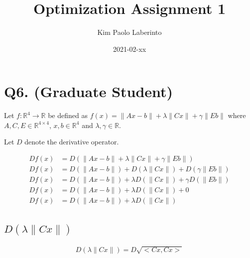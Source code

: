 \documentclass{article}
\title{Optimization Assignment 1}
\date{2021-02-xx}
\author{Kim Paolo Laberinto}
\begin{document}
    \maketitle
    \newpage

    \section{Q6. (Graduate Student)}

    Let $f: \mathbb{R}^4 \rightarrow \mathbb{R}$ be defined as $f(x) = \| Ax - b \| + \lambda \| Cx \| + \gamma \| Eb \|$ where $A, C, E \in \mathbb{R}^{4 \times 4}$, $x,b \in \mathbb{R}^4$ and $\lambda,\gamma \in \mathbb{R}$.

    Let $D$ denote the derivative operator.

    \begin{align*}
    Df(x) &= D \left( \| Ax - b \| + \lambda \| Cx \| + \gamma \| Eb \| \right) \\
    Df(x) &= D \left( \| Ax - b \| \right) +  D \left(\lambda \| Cx \| \right) +  D \left(\gamma \| Eb \| \right) \\
    Df(x) &= D \left( \| Ax - b \| \right) +  \lambda D \left( \| Cx \| \right) +  \gamma D \left( \| Eb \| \right) \\
    Df(x) &= D \left( \| Ax - b \| \right) +  \lambda D \left( \| Cx \| \right) +  0 \\
    Df(x) &= D \left( \| Ax - b \| \right) +  \lambda D \left( \| Cx \| \right) \\
    \end{align*}

    \subsection{ $D \left(\lambda \| Cx \| \right)$ }

    \begin{align*}
        D\left(\lambda \| Cx \| \right) = D \sqrt{<Cx, Cx>}
    \end{align*}
\end{document}
